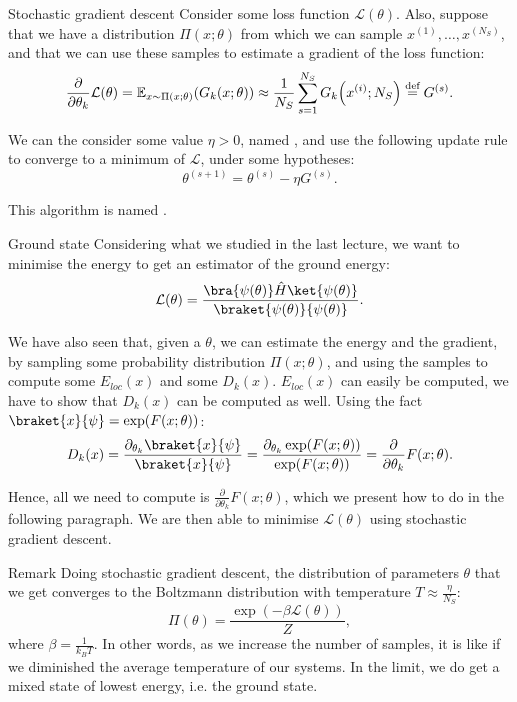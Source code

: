 \documentclass[a4paper]{article}
\begin{document}
\begin{parag}{Stochastic gradient descent}
    Consider some loss function $\mathcal{L}\left(\theta\right)$. Also, suppose that we have a distribution $\Pi\left(x; \theta\right)$ from which we can sample $x^{\left(1\right)}, \ldots, x^{\left(N_S\right)}$, and that we can use these samples to estimate a gradient of the loss function: 
    \[\frac{\partial}{\partial \theta_k} \mathcal{L}\left(\theta\right) = \exval_{x \followsdistr \Pi\left(x; \theta\right)}\left(G_k\left(x; \theta\right)\right) \approx \frac{1}{N_S} \sum_{s=1}^{N_S} G_k\left(x^{\left(i\right)}; N_S\right) \over{=}{def} G^{\left(s\right)}.\]

    We can the consider some value $\eta > 0$, named , and use the following update rule to converge to a minimum of $\mathcal{L}$, under some hypotheses: 
    \[\theta^{\left(s+1\right)} = \theta^{\left(s\right)} - \eta G^{\left(s\right)}.\]

    This algorithm is named .
\end{parag}

\begin{parag}{Ground state}
    Considering what we studied in the last lecture, we want to minimise the energy to get an estimator of the ground energy: 
    \[\mathcal{L}\left(\theta\right) = \frac{\bra{\psi\left(\theta\right)} \hat{H} \ket{\psi\left(\theta\right)}}{\braket{\psi\left(\theta\right)}{\psi\left(\theta\right)}}.\]
    
    We have also seen that, given a $\theta$, we can estimate the energy and the gradient, by sampling some probability distribution $\Pi\left(x; \theta\right)$, and using the samples to compute some $E_{loc}\left(x\right)$ and some $D_k\left(x\right)$. $E_{loc}\left(x\right)$ can easily be computed, we have to show that $D_k\left(x\right)$ can be computed as well. Using the fact $\braket{x}{\psi} = \exp\left(F\left(x; \theta\right)\right)$: 
    \[D_k\left(x\right) = \frac{\partial_{\theta_k} \braket{x}{\psi}}{\braket{x}{\psi}} = \frac{\partial_{\theta_k} \exp\left(F\left(x; \theta\right)\right)}{\exp\left(F\left(x; \theta\right)\right)} = \frac{\partial}{\partial \theta_k} F\left(x; \theta\right).\]
    
    Hence, all we need to compute is $\frac{\partial}{\partial \theta_k} F\left(x; \theta\right)$, which we present how to do in the following paragraph. We are then able to minimise $\mathcal{L}\left(\theta\right)$ using stochastic gradient descent.

    \begin{subparag}{Remark}
        Doing stochastic gradient descent, the distribution of parameters $\theta$ that we get converges to the Boltzmann distribution with temperature $T \approx \frac{\eta}{N_S}$: 
        \[\Pi\left(\theta\right) = \frac{\exp\left(- \beta \mathcal{L}\left(\theta\right)\right)}{Z},\]
        where $\beta = \frac{1}{k_B T}$. In other words, as we increase the number of samples, it is like if we diminished the average temperature of our systems. In the limit, we do get a mixed state of lowest energy, i.e. the ground state.  \end{subparag}
\end{parag}
\end{document}
